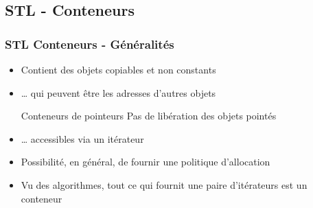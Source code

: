 \documentclass[C++.tex]{subfiles}
\begin{document}
\subsection*{STL - Conteneurs}
\begin{frame}[fragile]
	\frametitle{STL Conteneurs - Généralités}
	\begin{itemize}
		\item Contient des objets copiables et non constants


		\item \ldots{} qui peuvent être les adresses d'autres objets

		\begin{alertblock}{Conteneurs de pointeurs}
			Pas de libération des objets \og pointés\fg{}
		\end{alertblock}

		\item \ldots{} accessibles via un itérateur
		\item Possibilité, en général, de fournir une politique d'allocation


		\item Vu des algorithmes, tout ce qui fournit une paire d'itérateurs est un conteneur
	\end{itemize}
\end{frame}
\end{document}

